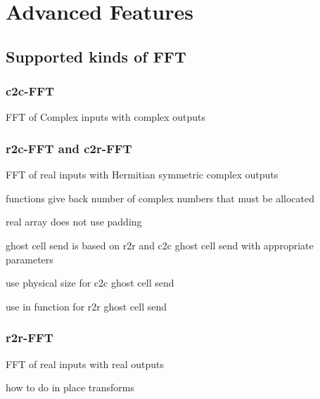 \chapter{Advanced Features}\label{chap:feat}


\section{Supported kinds of FFT}

\subsection{c2c-FFT}
FFT of Complex inputs with complex outputs

\subsection{r2c-FFT and c2r-FFT}
FFT of real inputs with Hermitian symmetric complex outputs
\begin{compactitem}
  \item {} functions give back number of complex numbers that must be allocated
  \item real array does not use padding
  \item ghost cell send is based on r2r and c2c ghost cell send with appropriate parameters 
  \begin{compactitem}
    \item use physical size for c2c ghost cell send
    \item use  in  function for r2r ghost cell send
  \end{compactitem}
\end{compactitem}




\subsection{r2r-FFT}
FFT of real inputs with real outputs



\begin{compactitem}
  \item how to do in place transforms
\end{compactitem}



